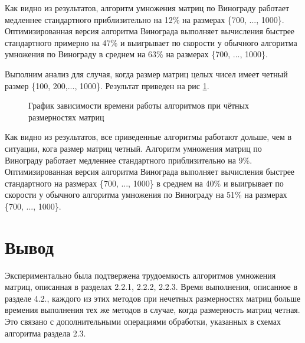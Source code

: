 Как видно из результатов, алгоритм умножения матриц по Винограду работает медленнее стандартного приблизительно на 12\% на размерах \{700, ..., 1000\}. Оптимизированная версия алгоритма Винограда выполняет вычисления быстрее стандартного примерно на 47\% и выигрывает по скорости у обычного алгоритма умножения по Винограду в среднем на 63\% на размерах \{700, ..., 1000\}.


Выполним анализ для случая, когда размер матриц целых чисел имеет четный размер \{100, 200,..., 1000\}. Результат приведен на рис \ref{fg:6_2}.
\begin{figure}[H]
	\centering
		\caption{График зависимости времени работы алгоритмов при чётных размерностях матриц} 
		\label{fg:6_2}
	\end{figure}
Как видно из результатов, все приведенные алгоритмы работают дольше, чем в ситуации, кога размер матриц четный. Алгоритм умножения матриц по Винограду работает медленнее стандартного приблизительно на 9\%. Оптимизированная версия алгоритма Винограда выполняет вычисления быстрее стандартного на размерах \{700, ..., 1000\} в среднем на 40\% и выигрывает по скорости у обычного алгоритма умножения по Винограду на 51\% на размерах \{700, ..., 1000\}.

\section{Вывод}
Экспериментально была подтвержена трудоемкость алгоритмов умножения матриц, описанная в разделах 2.2.1, 2.2.2, 2.2.3. Время выполнения, описанное в разделе 4.2., каждого из этих методов при нечетных размерностях матриц больше времения выполнения тех же методов в случае, когда размерность матриц четная. Это связано с дополнительными операциями обработки, указанных в схемах алгоритма раздела 2.3.